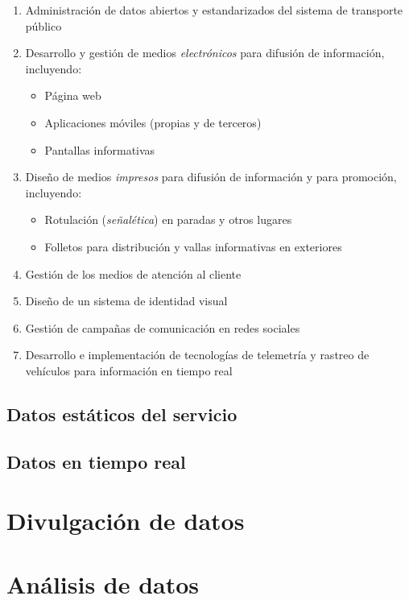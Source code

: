 \documentclass{report}
\begin{document}
\begin{enumerate}[noitemsep]
    \item Administración de datos abiertos y estandarizados del sistema de transporte público
    \item Desarrollo y gestión de medios \textit{electrónicos} para difusión de información, incluyendo:
    \begin{itemize}
        \item Página web
        \item Aplicaciones móviles (propias y de terceros)
        \item Pantallas informativas
    \end{itemize}
    \item Diseño de medios \textit{impresos} para difusión de información y para promoción, incluyendo:
    \begin{itemize}
        \item Rotulación (\textit{señalética}) en paradas y otros lugares
        \item Folletos para distribución y vallas informativas en exteriores
    \end{itemize}
    \item Gestión de los medios de atención al cliente
    \item Diseño de un sistema de identidad visual
    \item Gestión de campañas de comunicación en redes sociales
    \item Desarrollo e implementación de tecnologías de telemetría y rastreo de vehículos para información en tiempo real
\end{enumerate}

\subsection{Datos estáticos del servicio}

\subsection{Datos en tiempo real}

\section{Divulgación de datos}



\section{Análisis de datos}
\end{document}
